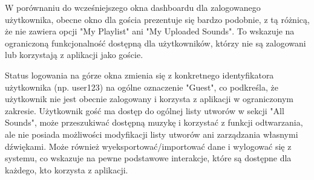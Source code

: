 {W porównaniu do wcześniejszego okna dashboardu dla zalogowanego użytkownika, obecne okno dla gościa prezentuje się bardzo podobnie, z tą różnicą, że nie zawiera opcji "My Playlist" ani "My Uploaded Sounds". To wskazuje na ograniczoną funkcjonalność dostępną dla użytkowników, którzy nie są zalogowani lub korzystają z aplikacji jako goście.

Status logowania na górze okna zmienia się z konkretnego identyfikatora użytkownika (np. user123) na ogólne oznaczenie "Guest", co podkreśla, że użytkownik nie jest obecnie zalogowany i korzysta z aplikacji w ograniczonym zakresie. Użytkownik gość ma dostęp do ogólnej listy utworów w sekcji "All Sounds", może przeszukiwać dostępną muzykę i korzystać z funkcji odtwarzania, ale nie posiada możliwości modyfikacji listy utworów ani zarządzania własnymi dźwiękami. Może również wyeksportować/importować dane i wylogować się z systemu, co wskazuje na pewne podstawowe interakcje, które są dostępne dla każdego, kto korzysta z aplikacji.}

